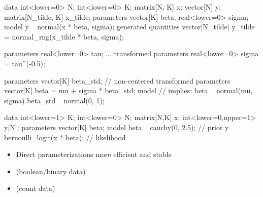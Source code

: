 \documentclass[10pt]{report}
\begin{document}
%
\begin{stancode}
data {
  int<lower=0> N;               int<lower=0> K;
  matrix[N, K] x;               vector[N] y;
  matrix[N_tilde, K] x_tilde;
}
parameters {
  vector[K] beta;               real<lower=0> sigma;
}
model {
  y ~ normal(x * beta, sigma);
}
generated quantities {
  vector[N_tilde] y_tilde
    = normal_rng(x_tilde * beta, sigma);
}
\end{stancode}


%
\begin{stancode}
    parameters {
      real<lower=0> tau;
      ...
    }
    transformed parameters {
      real<lower=0> sigma = tau^(-0.5);
    }
\end{stancode}


%
\begin{stancode}
parameters {
  vector[K] beta_std;  // non-centered
}
transformed parameters {
  vector[K] beta =  mu + sigma * beta_std;
}
model {
  // implies:  beta ~ normal(mu, sigma)
  beta_std ~ normal(0, 1);
}
\end{stancode}


%
\begin{stancode}
     data {
       int<lower=1> K;
       int<lower=0> N;
       matrix[N,K] x;
       int<lower=0,upper=1> y[N];
     }
     parameters {
       vector[K] beta;
     }
     model {
        beta ~ cauchy(0, 2.5);          // prior
        y ~ bernoulli_logit(x * beta);  // likelihood
     }
\end{stancode}


%
\begin{itemize}
\item Direct parameterizations more efficient and stable
\item {} (boolean/binary data)
\item {} (count data)
\end{itemize}
\end{document}

